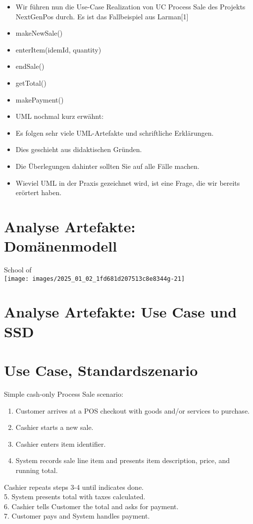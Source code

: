 \documentclass[10pt]{article}
\begin{document}
\begin{itemize}
  \item Wir führen nun die Use-Case Realization von UC Process Sale des Projekts NextGenPos durch. Es ist das Fallbeispiel aus Larman[1]
  \item makeNewSale()
  \item enterItem(idemId, quantity)
  \item endSale()
  \item getTotal()
  \item makePayment()
  \item UML nochmal kurz erwähnt:
  \item Es folgen sehr viele UML-Artefakte und schriftliche Erklärungen.
  \item Dies geschieht aus didaktischen Gründen.
  \item Die Überlegungen dahinter sollten Sie auf alle Fälle machen.
  \item Wieviel UML in der Praxis gezeichnet wird, ist eine Frage, die wir bereits erörtert haben.
\end{itemize}

\section*{Analyse Artefakte: Domänenmodell}
School of\\
\texttt{[image: images/2025\_01\_02\_1fd681d207513c8e8344g-21]}

\section*{Analyse Artefakte: Use Case und SSD}
\section*{Use Case, Standardszenario}
Simple cash-only Process Sale scenario:

\begin{enumerate}
  \item Customer arrives at a POS checkout with goods and/or services to purchase.
  \item Cashier starts a new sale.
  \item Cashier enters item identifier.
  \item System records sale line item and presents item description, price, and running total.
\end{enumerate}

Cashier repeats steps 3-4 until indicates done.\\
5. System presents total with taxes calculated.\\
6. Cashier tells Customer the total and asks for payment.\\
7. Customer pays and System handles payment.
\end{document}
